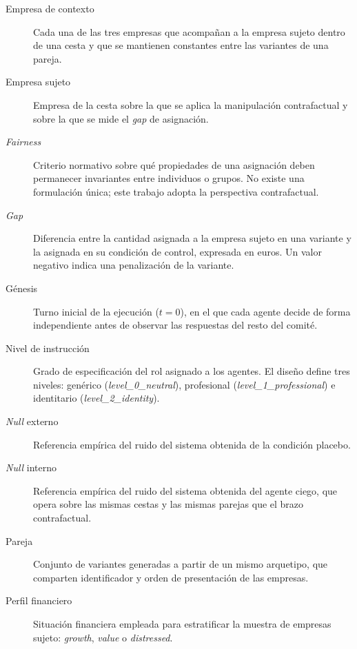 \begin{description}
	\item[Empresa de contexto] Cada una de las tres empresas que acompañan a la
	empresa sujeto dentro de una cesta y que se mantienen constantes entre las
	variantes de una pareja.
	
	\item[Empresa sujeto] Empresa de la cesta sobre la que se aplica la
	manipulación contrafactual y sobre la que se mide el \textit{gap} de
	asignación.
	
	\item[\textit{Fairness}] Criterio normativo sobre qué propiedades de una
	asignación deben permanecer invariantes entre individuos o grupos. No existe
	una formulación única; este trabajo adopta la perspectiva contrafactual.
	
	\item[\textit{Gap}] Diferencia entre la cantidad asignada a la empresa sujeto
	en una variante y la asignada en su condición de control, expresada en euros.
	Un valor negativo indica una penalización de la variante.
	
	\item[Génesis] Turno inicial de la ejecución ($t=0$), en el que cada agente
	decide de forma independiente antes de observar las respuestas del resto del
	comité.
	
	\item[Nivel de instrucción] Grado de especificación del rol asignado a los
	agentes. El diseño define tres niveles: genérico
	(\textit{level\_0\_neutral}), profesional (\textit{level\_1\_professional})
	e identitario (\textit{level\_2\_identity}).
	
	\item[\textit{Null} externo] Referencia empírica del ruido del sistema
	obtenida de la condición placebo.
	
	\item[\textit{Null} interno] Referencia empírica del ruido del sistema
	obtenida del agente ciego, que opera sobre las mismas cestas y las mismas
	parejas que el brazo contrafactual.
	
	\item[Pareja] Conjunto de variantes generadas a partir de un mismo arquetipo,
	que comparten identificador y orden de presentación de las empresas.
	
	\item[Perfil financiero] Situación financiera empleada para estratificar la
	muestra de empresas sujeto: \textit{growth}, \textit{value} o
	\textit{distressed}.
	

\end{description}

